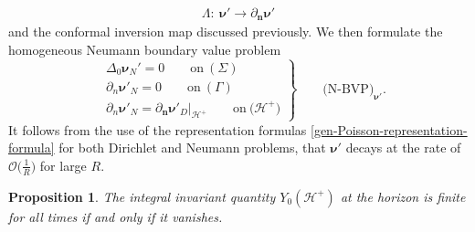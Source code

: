 \documentclass[11pt]{article}
\numberwithin{equation}{section}
\def\ptl{\partial}%
\def\mbo#1{\boldsymbol{#1}}%
\numberwithin{equation}{section}
\newtheorem{Proposition}[Theorem]{Proposition}
\begin{document}
\begin{align*}
\Lambda \colon\ \mbo{\nu'} \to \ptl_{\mbo{n}} \mbo{\nu}'
\end{align*}
 and the conformal inversion map discussed previously. We then formulate the homogeneous Neumann boundary value problem
\begin{equation*}
\left.\begin{aligned}
&\Delta_0 \mbo{\nu}_N'=0 \qquad \text{on} \ (\Sigma)\\
&\ptl_n \mbo{\nu}'_N=0 \qquad \text{on} \ (\Gamma) \\
&\ptl_n \mbo{\nu}'_N= \ptl_{\mbo{n}} \mbo{\nu}'_D \big\vert_{\mathcal{H}^+} \qquad \text{on} \ \bigl(\mathcal{H}^{+}\bigr)
\end{aligned}
 \right\}
\qquad \text{(N-BVP)}_{\mbo{\nu'}}.
\end{equation*}
It follows from the use of the representation formulas \eqref{gen-Poisson-representation-formula} for both Dirichlet and Neumann problems, that $\mbo{\nu}'$ decays at the rate of $\mathcal{O}\bigl(\frac{1}{R}\bigr)$ for large $R$.
\begin{Proposition}
	The integral invariant quantity $Y_0(\mathcal{H}^+)$ at the horizon is finite for all times if and only if it vanishes.
\end{Proposition}
\end{document}
